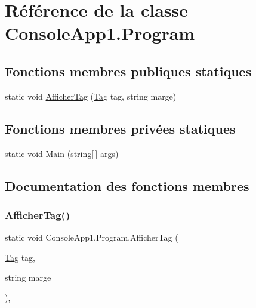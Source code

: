 \hypertarget{class_console_app1_1_1_program}{}\section{Référence de la classe Console\+App1.\+Program}
\label{class_console_app1_1_1_program}
\subsection*{Fonctions membres publiques statiques}
\begin{DoxyCompactItemize}
\item 
static void \mbox{\hyperlink{class_console_app1_1_1_program_abeb3482b7b0fd239052d4a5299d3831e}{Afficher\+Tag}} (\mbox{\hyperlink{class_m_t_connect_agent_1_1_model_1_1_tag}{Tag}} tag, string marge)
\end{DoxyCompactItemize}
\subsection*{Fonctions membres privées statiques}
\begin{DoxyCompactItemize}
\item 
static void \mbox{\hyperlink{class_console_app1_1_1_program_ae6cedb55c6b52f4193827df8c1cf88cc}{Main}} (string\mbox{[}$\,$\mbox{]} args)
\end{DoxyCompactItemize}


\subsection{Documentation des fonctions membres}
\mbox{\label{class_console_app1_1_1_program_abeb3482b7b0fd239052d4a5299d3831e}} 
\subsubsection{\texorpdfstring{Afficher\+Tag()}{AfficherTag()}}
{\footnotesize\ttfamily static void Console\+App1.\+Program.\+Afficher\+Tag (\begin{DoxyParamCaption}\item[{\mbox{\hyperlink{class_m_t_connect_agent_1_1_model_1_1_tag}{Tag}}}]{tag,  }\item[{string}]{marge }\end{DoxyParamCaption})\hspace{0.3cm}{\ttfamily [inline]}, {\ttfamily [static]}}

